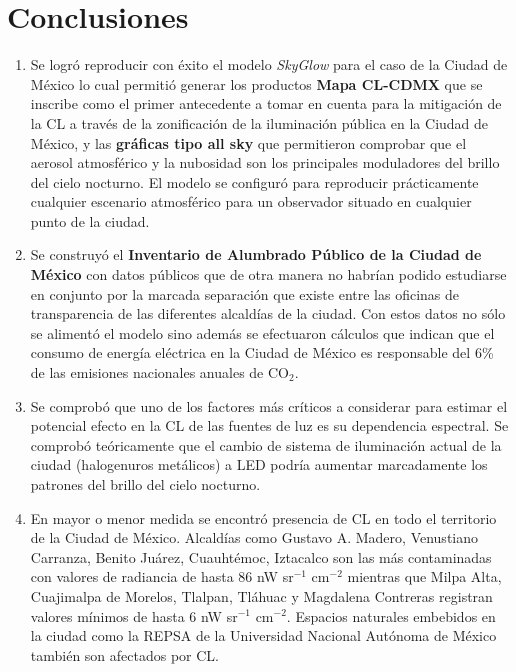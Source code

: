 \chapter{Conclusiones}
\label{chap:conclusiones}

\begin{enumerate}[I]

\item Se logró reproducir con éxito el modelo \textit{SkyGlow} para el caso de la Ciudad de México lo cual permitió generar los productos \textbf{Mapa CL-CDMX} que se inscribe como el primer antecedente a tomar en cuenta para la mitigación de la CL a través de la zonificación de la iluminación pública en la Ciudad de México, y las \textbf{gráficas tipo all sky} que permitieron comprobar que el aerosol atmosférico y la nubosidad son los principales moduladores del brillo del cielo nocturno. El modelo se configuró para reproducir prácticamente cualquier escenario atmosférico para un observador situado en cualquier punto de la ciudad.

\item Se construyó el \textbf{Inventario de Alumbrado Público de la Ciudad de México} con datos públicos que de otra manera no habrían podido estudiarse en conjunto por la marcada separación que existe entre las oficinas de transparencia de las diferentes alcaldías de la ciudad. Con estos datos no sólo se alimentó el modelo sino además se efectuaron cálculos que indican que el consumo de energía eléctrica en la Ciudad de México es responsable del 6\% de las emisiones nacionales anuales de CO$_2$.

\item Se comprobó que uno de los factores más críticos a considerar para estimar el potencial efecto en la CL de las fuentes de luz es su dependencia espectral. Se comprobó teóricamente que el cambio de sistema de iluminación actual de la ciudad (halogenuros metálicos) a LED podría aumentar marcadamente los patrones del brillo del cielo nocturno. 

\item En mayor o menor medida se encontró presencia de CL en todo el territorio de la Ciudad de México. Alcaldías como Gustavo A. Madero, Venustiano Carranza, Benito Juárez, Cuauhtémoc, Iztacalco son las más contaminadas con valores de radiancia de hasta 86 nW sr$^{-1}$ cm$^{-2}$ mientras que Milpa Alta, Cuajimalpa de Morelos, Tlalpan, Tláhuac y Magdalena Contreras registran valores mínimos de hasta 6 nW sr$^{-1}$ cm$^{-2}$. Espacios naturales embebidos en la ciudad como la REPSA de la Universidad Nacional Autónoma de México también son afectados por CL.

\end{enumerate}